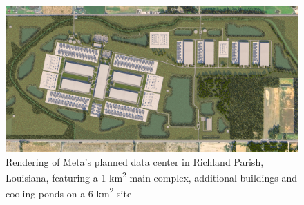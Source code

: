 \documentclass[aspectratio=169]{beamer}
\begin{document}
    \begin{frame}
        \begin{figure}
            \includegraphics[height=0.5\textwidth]{images/meta_richland_parish_louisiana_data_center}
            \caption{Rendering of Meta's planned data center in Richland Parish, Louisiana, featuring a 1 km\textsuperscript{2} main complex, additional buildings and cooling ponds on a 6 km\textsuperscript{2} site~\parencite{meta_louisiana_datacenter_facebook_2024}}
        \end{figure}
    \end{frame}
\end{document}
